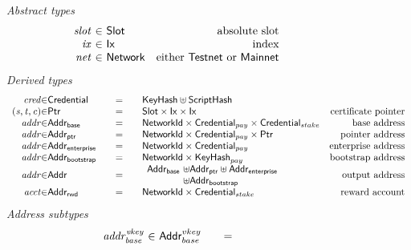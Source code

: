 \begin{figure*}[hbt]
  \emph{Abstract types}
  \begin{equation*}
    \begin{array}{r@{~\in~}lr}
      \var{slot} & \Slot & \text{absolute slot}\\
      \var{ix} & \Ix & \text{index}\\
      \var{net} & \Network & \text{either $\mathsf{Testnet}$ or $\mathsf{Mainnet}$}\\
    \end{array}
  \end{equation*}
  \emph{Derived types}
  \begin{equation*}
    \begin{array}{r@{\in}l@{\qquad=\qquad}lr}
      \var{cred} & \Credential & \KeyHash\uniondistinct\HashScr \\
      \var{(s,t,c)}
      & \Ptr
      & \Slot\times\Ix\times\Ix
      & \text{certificate pointer}
      \\
      \var{addr}
      & \AddrB
      & \NetworkId\times\Credential_{pay}\times\Credential_{stake}
      & \text{base address}
      \\
      \var{addr}
      & \AddrP
      & \NetworkId\times\Credential_{pay}\times\Ptr
      & \text{pointer address}
      \\
      \var{addr}
      & \AddrE
      & \NetworkId\times\Credential_{pay}
      & \text{enterprise address}
      \\
      \var{addr}
      & \AddrBS
      & \NetworkId\times\KeyHash_{pay}
      & \text{bootstrap address}
      \\
      \var{addr}
      & \Addr
      & \begin{array}{l@{~\uniondistinct}l}
          \AddrB & \AddrP \uniondistinct \AddrE
          \\
                 & \AddrBS
        \end{array}
      & \text{output address}
      \\
      \var{acct}
      & \AddrRWD
      & \NetworkId\times\Credential_{stake}
      & \text{reward account}
      \\
    \end{array}
  \end{equation*}
  \emph{Address subtypes}
  \begin{equation*}
    \begin{array}{r@{~\in~}l@{\qquad=\qquad}lr}
      \var{addr^{vkey}_{base}}
                 & \Addr^{vkey}_{base}

\end{array}
\end{equation*}
\end{figure*}
